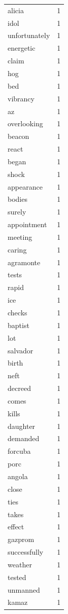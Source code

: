 \begin{tabular}{lr}
alicia & 1 \\
idol & 1 \\
unfortunately & 1 \\
energetic & 1 \\
claim & 1 \\
hog & 1 \\
bed & 1 \\
vibrancy & 1 \\
az & 1 \\
overlooking & 1 \\
beacon & 1 \\
react & 1 \\
began & 1 \\
shock & 1 \\
appearance & 1 \\
bodies & 1 \\
surely & 1 \\
appointment & 1 \\
meeting & 1 \\
caring & 1 \\
agramonte & 1 \\
tests & 1 \\
rapid & 1 \\
ice & 1 \\
checks & 1 \\
baptist & 1 \\
lot & 1 \\
salvador & 1 \\
birth & 1 \\
neft & 1 \\
decreed & 1 \\
comes & 1 \\
kills & 1 \\
daughter & 1 \\
demanded & 1 \\
forcuba & 1 \\
porc & 1 \\
angola & 1 \\
close & 1 \\
ties & 1 \\
takes & 1 \\
effect & 1 \\
gazprom & 1 \\
successfully & 1 \\
weather & 1 \\
tested & 1 \\
unmanned & 1 \\
kamaz & 1 \\

\end{tabular}
